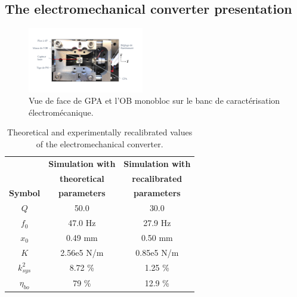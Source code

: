 \documentclass[3p,twocolumn,preprint]{elsarticle}
\begin{document}
	\subsection{The electromechanical converter presentation}	
	\label{The electromechanical converter presentation}

\begin{figure}[!htbp]
	\centering
	\captionsetup{justification=centering}
	\includegraphics[trim={1cm 3cm 2cm 2.5cm},clip,width=0.45\textwidth]{figures/BDT_OB+GPA.pdf}
	\caption{Vue de face de GPA et l’OB monobloc sur le banc de caractérisation
	électromécanique.}
	\label{fig:BDT_OB+GPA}
\end{figure}
\begin{table}[!htbp]
\centering
\captionsetup{justification=centering}
	\begin{tabular}{ c | c | c }
	\toprule
	& \textbf{Simulation with}  	   & \textbf{Simulation with}        \\
	& \textbf{theoretical}  		   & \textbf{recalibrated }			 \\
	\multirow{-3}{*}{\textbf{Symbol}}
	& \textbf{parameters}			   & \textbf{parameters} 			 \\
	\midrule
	$Q$                       & 50.0                  & 30.0 		  	\\  
	$f_0$                     & 47.0 Hz               & 27.9 Hz  		\\
	$x_0$                     & 0.49 mm               & 0.50 mm    		\\
	$K$                       & 2.56e5 N/m            & 0.85e5 N/m 		\\
	${k^2_{sys}}$             & 8.72 \%               & 1.25 \% 		\\
	$\eta_{bo}$               & 79 \%                 & 12.9 \%   		\\
	\bottomrule
	\end{tabular}
	\caption{Theoretical and experimentally recalibrated values of the electromechanical converter.}
	\label{tab:parametres_lacher_free}
\end{table} 
\end{document}

